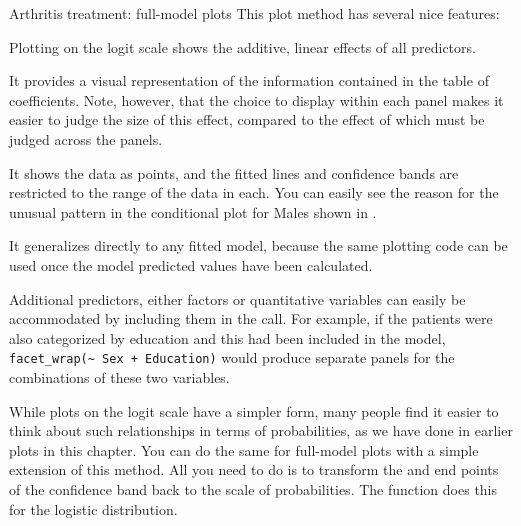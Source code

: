 \documentclass[11pt]{book}\usepackage[]{graphicx}\usepackage[]{color}
\newenvironment{knitrout}{}{} %
\renewenvironment{knitrout}{\small\renewcommand{\baselinestretch}{.85}}{} %
\begin{document}
\begin{Example}{Arthritis treatment: full-model plots}
\begin{knitrout}
\end{knitrout}
This plot method has several nice features:
\begin{itemize*}
  \item Plotting on the logit scale shows the additive, linear effects of all predictors.
  \item It provides a visual representation of the information contained in the table of
  coefficients.  Note, however, that the choice to display  within each
  panel makes it easier to judge the size of this effect, compared to the effect of
   which must be judged across the panels.
  \item It shows the data as points, and the fitted lines and confidence bands are restricted
  to the range of the data in each.  You can easily see the reason for the unusual
  pattern in the conditional plot for Males shown in .
  \item It generalizes directly to any fitted model, because the same plotting code can
  be used once the model predicted values have been calculated.
  \item Additional predictors, either factors or quantitative variables can easily be
  accommodated by including them in the  call.  For example, if the
  patients were also categorized by education and this had been included in the model,
  \verb|facet_wrap(~ Sex + Education)| would produce separate panels for the combinations
  of these two variables.
\end{itemize*}

While plots on the logit scale have a simpler form, many people find it easier to think
about such relationships in terms of probabilities, as we have done in earlier plots
in this chapter.  You can do the same for full-model plots with a simple extension
of this method.  All you need to do is to transform the  and
end points of the confidence band back to the scale of probabilities.
The  function  does this for the logistic
distribution.


\end{Example}
\end{document}
